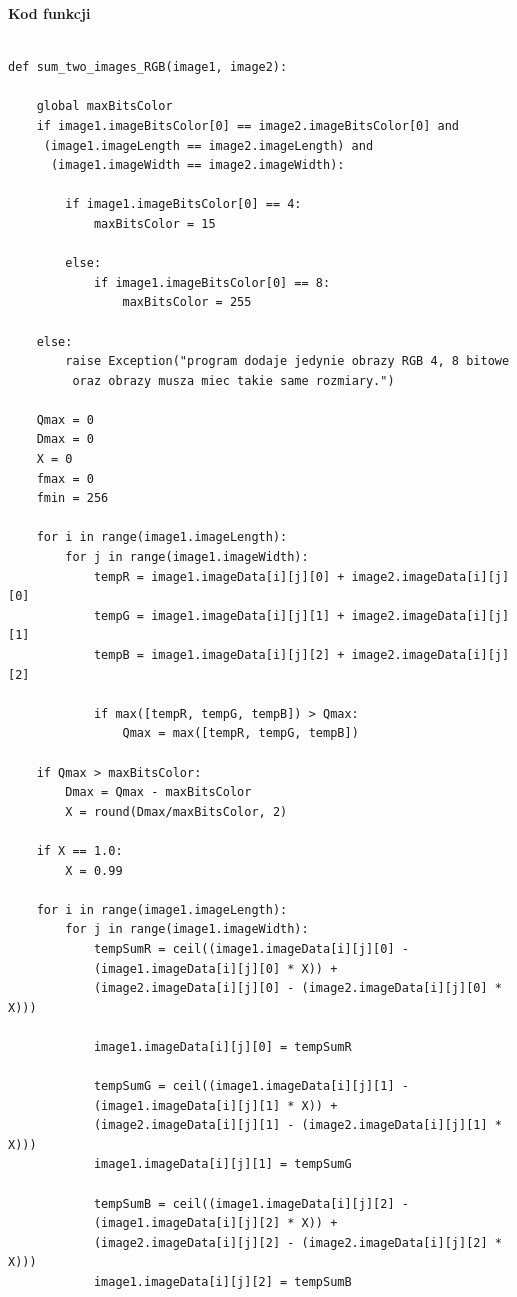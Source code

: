 \documentclass[magisterska,openany]{pracadypl}
\begin{document}
\newpage
\textbf{\Large Kod funkcji}
   
\lstset{language=Python}
\vspace{0.25cm}
\begin{lstlisting}[caption={Sumowanie dwóch obrazów barwowych}]

def sum_two_images_RGB(image1, image2):

    global maxBitsColor
    if image1.imageBitsColor[0] == image2.imageBitsColor[0] and
     (image1.imageLength == image2.imageLength) and
      (image1.imageWidth == image2.imageWidth):

        if image1.imageBitsColor[0] == 4:
            maxBitsColor = 15

        else:
            if image1.imageBitsColor[0] == 8:
                maxBitsColor = 255

    else:
        raise Exception("program dodaje jedynie obrazy RGB 4, 8 bitowe
         oraz obrazy musza miec takie same rozmiary.")

    Qmax = 0
    Dmax = 0
    X = 0
    fmax = 0
    fmin = 256

    for i in range(image1.imageLength):
        for j in range(image1.imageWidth):
            tempR = image1.imageData[i][j][0] + image2.imageData[i][j][0]
            tempG = image1.imageData[i][j][1] + image2.imageData[i][j][1]
            tempB = image1.imageData[i][j][2] + image2.imageData[i][j][2]

            if max([tempR, tempG, tempB]) > Qmax:
                Qmax = max([tempR, tempG, tempB])

    if Qmax > maxBitsColor:
        Dmax = Qmax - maxBitsColor
        X = round(Dmax/maxBitsColor, 2)

    if X == 1.0:
        X = 0.99

    for i in range(image1.imageLength):
        for j in range(image1.imageWidth):
            tempSumR = ceil((image1.imageData[i][j][0] - 
            (image1.imageData[i][j][0] * X)) + 
            (image2.imageData[i][j][0] - (image2.imageData[i][j][0] * X)))

            image1.imageData[i][j][0] = tempSumR

            tempSumG = ceil((image1.imageData[i][j][1] - 
            (image1.imageData[i][j][1] * X)) + 
            (image2.imageData[i][j][1] - (image2.imageData[i][j][1] * X)))
            image1.imageData[i][j][1] = tempSumG

            tempSumB = ceil((image1.imageData[i][j][2] - 
            (image1.imageData[i][j][2] * X)) + 
            (image2.imageData[i][j][2] - (image2.imageData[i][j][2] * X)))
            image1.imageData[i][j][2] = tempSumB


\end{lstlisting}
\end{document}
